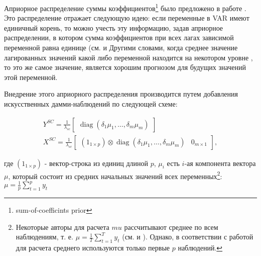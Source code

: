 \documentclass[11pt]{article} %
\DeclareMathOperator{\diag}{diag}
\newcommand{\post}{\overline}
\begin{document}
Априорное распределение суммы коэффициентов\footnote{sum-of-coefficints prior} было предложено в работе  \cite{doan_litterman_sims_1984_forecasting}. Это распределение отражает следующую идею: если переменные в VAR имеют единичный корень, то можно учесть эту информацию, задав априорное распределении, в котором сумма коэффициентов при всех лагах зависимой переменной равна единице (см. \cite{robertson_tallman_1999_vector} и \cite{blake_mumtaz_2012_applied} Другими словами, когда среднее значение лагированных значений какой либо переменной находится на некотором уровне , то это же самое значение, является хорошим прогнозом  для будущих значений этой переменной. 



Внедрение этого априорного распределения производится путем добавления искусственных дамми-наблюдений по следующей схеме:


\begin{gather}
Y^{SC}=\frac{1}{\lambda_{sc}}\begin{bmatrix}\diag(\delta_1\mu_1,\ldots,\delta_m\mu_m)\end{bmatrix}\\
X^{SC}=\frac{1}{\lambda_{sc}}\begin{bmatrix}(1_{1\times p})\otimes \diag(\delta_1\mu_1,\ldots,\delta_m\mu_m) &0_{m\times 1}\end{bmatrix},
\end{gather}

где $(1_{1\times p})$ - вектор-строка из единиц длиной $p$, $\mu_i$ есть $i$-ая компонента вектора $\mu$, который состоит из средних начальных значений всех переменных\footnote{Некоторые авторы для  расчета $mu$ рассчитывают среднее по всем наблюдениям, т. е. $\mu=\frac{1}{T}\sum_{t=1}^T y_t$ (см. \cite{banbura_al_2010_large} и \cite{carriero_al_2015_bayesian}). Однако, в соответствии с работой \cite{sims_zha_1998_bayesian} для расчета среднего используются только первые $p$ наблюдений.}: $\mu=\frac{1}{p}\sum_{t=1}^p y_t$  
\end{document}
